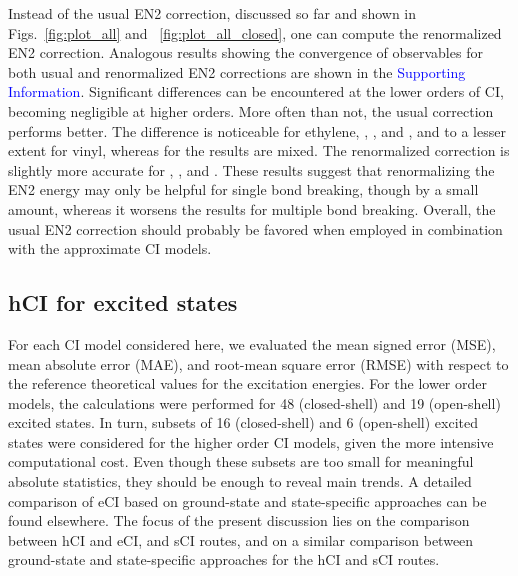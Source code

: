 \documentclass[aip,jcp,reprint,noshowkeys,superscriptaddress]{revtex4-1}
\newcommand{\SupInf}{\textcolor{blue}{Supporting Information}}
\begin{document}
Instead of the usual EN2 correction, discussed so far and shown in Figs.~\ref{fig:plot_all} and ~\ref{fig:plot_all_closed},
one can compute the renormalized EN2 correction. \cite{Garniron_2019}
Analogous results showing the convergence of observables for both usual and renormalized EN2 corrections are shown in the {\SupInf}.
Significant differences can be encountered at the lower orders of CI, becoming negligible at higher orders.
More often than not, the usual correction performs better.
The difference is noticeable for ethylene, , , and , and to a lesser extent for vinyl,
whereas for  the results are mixed.
The renormalized correction is slightly more accurate for , , and .
These results suggest that renormalizing the EN2 energy may only be helpful for single bond breaking, though by a small amount,
whereas it worsens the results for multiple bond breaking.
Overall, the usual EN2 correction should probably be favored when employed in combination with the approximate CI models.


\subsection{hCI for excited states}
\label{sec:res_C}

For each CI model considered here, we evaluated the mean signed error (MSE), mean absolute error (MAE), and root-mean square error (RMSE)
with respect to the reference theoretical values for the excitation energies.
For the lower order models, the calculations were performed for 48 (closed-shell) and 19 (open-shell) excited states.
In turn, subsets of 16 (closed-shell) and 6 (open-shell) excited states were considered for the higher order CI models, given the more intensive computational cost.
Even though these subsets are too small for meaningful absolute statistics, they should be enough to reveal main trends.
A detailed comparison of eCI based on ground-state and state-specific approaches can be found elsewhere. \cite{Kossoski_2023}
The focus of the present discussion lies on the comparison between hCI and eCI, and sCI routes,
and on a similar comparison between ground-state and state-specific approaches for the hCI and sCI routes.
\end{document}
